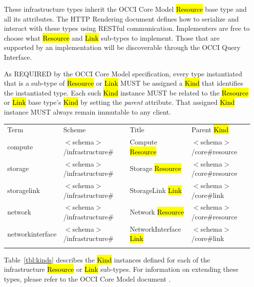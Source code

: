 \documentclass[10pt,a4paper]{article}
\begin{document}
These infrastructure types inherit the OCCI Core Model \hl{Resource}
base type and all its attributes. The HTTP Rendering document
\cite{occi:http_rendering} defines how to serialize and interact with
these types using RESTful communication. Implementers are free to
choose what \hl{Resource} and \hl{Link} sub-types to implement. Those
that are supported by an implementation will be discoverable through
the OCCI Query Interface.

As REQUIRED by the OCCI Core Model specification, every type
instantiated that is a sub-type of \hl{Resource} or \hl{Link} MUST be
assigned a \hl{Kind} that identifies the instantiated type. Each such
\hl{Kind} instance MUST be related to the \hl{Resource} or \hl{Link}
base type's \hl{Kind} by setting the \textit{parent} attribute.
 That assigned \hl{Kind} instance MUST always
remain immutable to any client.

 {
	\begin{tabular}{llll}
	\toprule
	Term & Scheme & Title & Parent \hl{Kind} \\
	\colrule
	compute &  $<$schema$>$/infrastructure\# & Compute \hl{Resource}
	& $<$schema$>$/core\#resource \\

	storage & $<$schema$>$/infrastructure\# & Storage \hl{Resource}
	& $<$schema$>$/core\#resource \\

	storagelink & $<$schema$>$/infrastructure\# & StorageLink \hl{Link}
	& $<$schema$>$/core\#link \\

	network & $<$schema$>$/infrastructure\# & Network \hl{Resource}
	& $<$schema$>$/core\#resource \\

	networkinterface & $<$schema$>$/infrastructure\# & NetworkInterface \hl{Link}
	& $<$schema$>$/core\#link \\

	\botrule
	\end{tabular}
}

Table~\ref{tbl:kinds} describes the \hl{Kind} instances defined for
each of the infrastructure \hl{Resource} or \hl{Link} sub-types. For
information on extending these types, please refer to the OCCI Core
Model document \cite{occi:core}.
\end{document}
